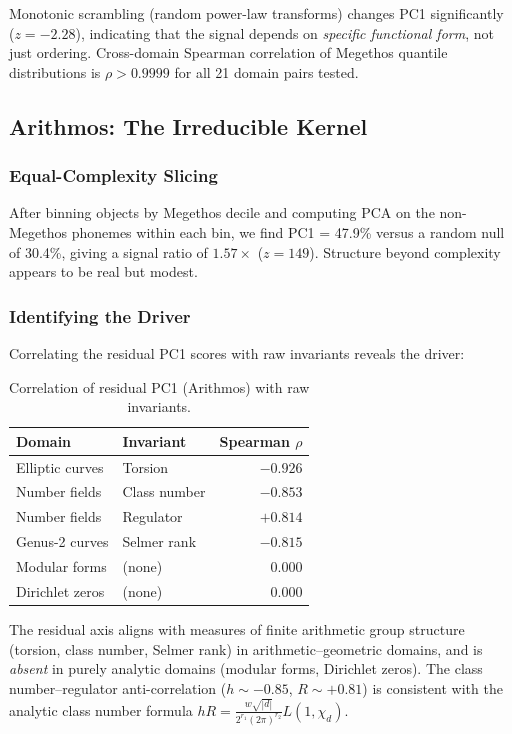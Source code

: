 \documentclass[11pt,a4paper]{article}
\begin{document}
Monotonic scrambling (random power-law transforms) changes PC1 significantly ($z = -2.28$), indicating that the signal depends on \emph{specific functional form}, not just ordering. Cross-domain Spearman correlation of Megethos quantile distributions is $\rho > 0.9999$ for all 21 domain pairs tested.

\subsection{Arithmos: The Irreducible Kernel}

\subsubsection{Equal-Complexity Slicing}

After binning objects by Megethos decile and computing PCA on the non-Megethos phonemes within each bin, we find PC1 = 47.9\% versus a random null of 30.4\%, giving a signal ratio of $1.57\times$ ($z = 149$). Structure beyond complexity appears to be real but modest.

\subsubsection{Identifying the Driver}

Correlating the residual PC1 scores with raw invariants reveals the driver:

\begin{table}[h]
\centering
\caption{Correlation of residual PC1 (Arithmos) with raw invariants.}
\label{tab:arithmos}
\begin{tabular}{llr}
\toprule
Domain & Invariant & Spearman $\rho$ \\
\midrule
Elliptic curves & Torsion & $-0.926$ \\
Number fields & Class number & $-0.853$ \\
Number fields & Regulator & $+0.814$ \\
Genus-2 curves & Selmer rank & $-0.815$ \\
Modular forms & (none) & $0.000$ \\
Dirichlet zeros & (none) & $0.000$ \\
\bottomrule
\end{tabular}
\end{table}

The residual axis aligns with measures of finite arithmetic group structure (torsion, class number, Selmer rank) in arithmetic--geometric domains, and is \emph{absent} in purely analytic domains (modular forms, Dirichlet zeros). The class number--regulator anti-correlation ($h \sim -0.85$, $R \sim +0.81$) is consistent with the analytic class number formula $hR = \frac{w\sqrt{|d|}}{2^{r_1}(2\pi)^{r_2}} L(1, \chi_d)$.
\end{document}
